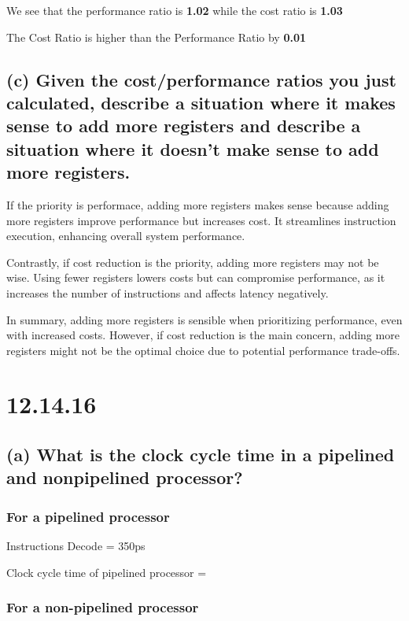 \documentclass{article}
\begin{document}
    We see that the performance ratio is \textbf{1.02} while the cost ratio is \textbf{1.03}

    The Cost Ratio is higher than the Performance Ratio by \textbf{0.01}

    \subsection*{(c) Given the cost/performance ratios you just calculated, describe a situation where it makes sense to
    add more registers and describe a situation where it
    doesn’t make sense to add more registers.}

    \noindent If the priority is performace, adding more registers makes sense because adding more registers improve performance but increases cost. It streamlines instruction
    execution, enhancing overall system performance.

    \noindent Contrastly, if cost reduction is the priority, adding more registers may
    not be wise. Using fewer registers lowers costs but can compromise performance,
    as it increases the number of instructions and affects latency negatively.
    
    \noindent In summary, adding more registers is sensible when prioritizing performance,
    even with increased costs. However, if cost reduction is the main concern, adding
    more registers might not be the optimal choice due to potential performance
    trade-offs.
    
    \newpage

    \section*{12.14.16}

    \subsection*{(a) What is the clock cycle time in a pipelined and nonpipelined processor?}

    \subsubsection*{For a pipelined processor}

    Instructions Decode = 350ps

    Clock cycle time of pipelined processor = 

    \subsubsection*{For a non-pipelined processor}
\end{document}
